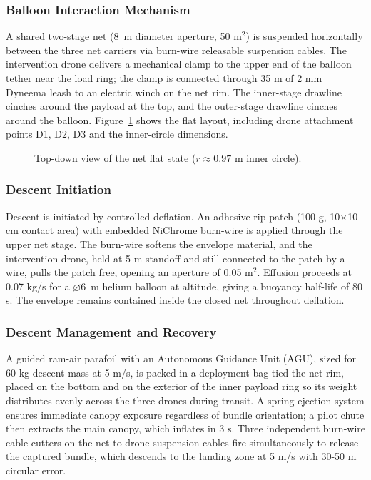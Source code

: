 \subsubsection{Balloon Interaction Mechanism}
A shared two-stage net (8~m diameter aperture, 50 m$^2$) is suspended horizontally between the three net carriers via burn-wire releasable suspension cables. The intervention drone delivers a mechanical clamp to the upper end of the balloon tether near the load ring; the clamp is connected through 35 m of 2 mm Dyneema leash to an electric winch on the net rim. The inner-stage drawline cinches around the payload at the top, and the outer-stage drawline cinches around the balloon. Figure~\ref{fig:net_layout} shows the flat layout, including drone attachment points D1, D2, D3 and the inner-circle dimensions.

\begin{figure}[H]
    \centering
    
    \caption{Top-down view of the net flat state ($r \approx 0.97$ m inner circle).}
    \label{fig:net_layout}
\end{figure}

\subsubsection{Descent Initiation}
Descent is initiated by controlled deflation. An adhesive rip-patch (100 g, 10$\times$10 cm contact area) with embedded NiChrome burn-wire is applied through the upper net stage. The burn-wire softens the envelope material, and the intervention drone, held at 5 m standoff and still connected to the patch by a wire, pulls the patch free, opening an aperture of 0.05 m$^2$. Effusion proceeds at 0.07 kg/s for a $\varnothing$6~m helium balloon at altitude, giving a buoyancy half-life of 80 s. The envelope remains contained inside the closed net throughout deflation.

\subsubsection{Descent Management and Recovery}
A guided ram-air parafoil with an Autonomous Guidance Unit (AGU), sized for 60 kg descent mass at 5 m/s, is packed in a deployment bag tied the net rim, placed on the bottom and on the exterior of the inner payload ring so its weight distributes evenly across the three drones during transit. A spring ejection system ensures immediate canopy exposure regardless of bundle orientation; a pilot chute then extracts the main canopy, which inflates in 3 s. Three independent burn-wire cable cutters on the net-to-drone suspension cables fire simultaneously to release the captured bundle, which descends to the landing zone at 5 m/s with 30-50 m circular error.

